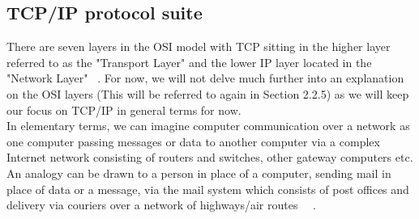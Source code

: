 \subsection{TCP/IP protocol suite}\label{TCP/IP}
There are seven layers in the OSI model with TCP sitting in the higher layer referred to as the "Transport Layer" and the lower IP layer located in the "Network Layer" ~\cite{2}. For now, we will not delve much further into an explanation on the OSI layers (This will be referred to again in Section 2.2.5) as we will keep our focus on TCP/IP in general terms for now. \\

In elementary terms, we can imagine computer communication over a network as one computer passing messages or data to another computer via a complex Internet network consisting of routers and switches, other gateway computers etc. An analogy can be drawn to a person in place of a computer, sending mail in place of data or a message, via the mail system which consists of post offices and delivery via couriers over a network of highways/air routes ~\cite{1}~\cite{2}. \\

